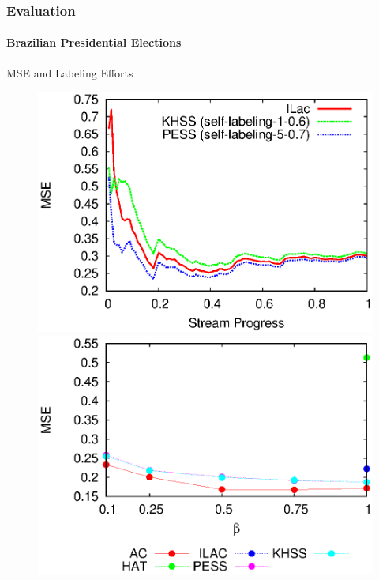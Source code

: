 \documentclass[14pt]{beamer}
\begin{document}

\begin{frame}
\frametitle{Evaluation}
\framesubtitle{Brazilian Presidential Elections}
MSE and Labeling Efforts
\begin{figure}[htp!]
\label{fig:dilma_1}
\centering
\includegraphics[scale=0.41]{dilma_mse.eps}
\includegraphics[scale=0.41]{dilma_le_mse.eps}
\end{figure}
\end{frame}
\end{document}
